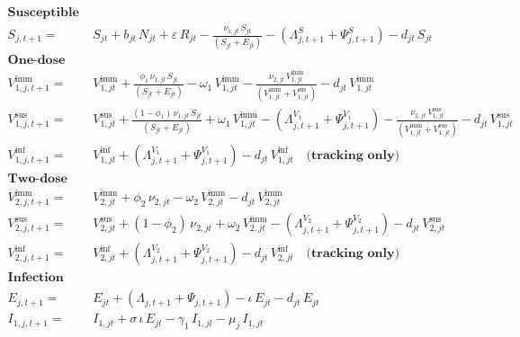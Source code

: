 \documentclass[
]{book}
\begin{document}
\begin{equation}
\begin{aligned}
\mathbf{\text{Susceptible population:}}\\[1mm]
S_{j,t+1} = \ & 
S_{jt} 
+ b_{jt}\,N_{jt} 
+ \varepsilon\,R_{jt} 
- \frac{\nu_{1,jt}\,S_{jt}}{\left(S_{jt}+E_{jt}\right)} 
- \left( \Lambda^{S}_{j,t+1} + \Psi^{S}_{j,t+1} \right) 
- d_{jt}\,S_{jt}\\[3mm]
\mathbf{\text{One-dose vaccination:}}\\[1mm]
V^{\text{imm}}_{1,j,t+1} = \ & 
V^{\text{imm}}_{1,jt} 
+ \frac{\phi_1\,\nu_{1,jt}\,S_{jt}}{\left(S_{jt}+E_{jt}\right)}
- \omega_1\,V^{\text{imm}}_{1,jt} 
- \frac{\nu_{2,jt}\,V^{\text{imm}}_{1,jt}}{\left(V^{\text{imm}}_{1,jt}+V^{\text{sus}}_{1,jt}\right)}
- d_{jt}\,V^{\text{imm}}_{1,jt}\\[1mm]
V^{\text{sus}}_{1,j,t+1} = \ & 
V^{\text{sus}}_{1,jt} 
+ \frac{\left(1-\phi_1\right)\,\nu_{1,jt}\,S_{jt}}{\left(S_{jt}+E_{jt}\right)}
+ \omega_1\,V^{\text{imm}}_{1,jt} 
- \left( \Lambda^{V_1}_{j,t+1} + \Psi^{V_1}_{j,t+1} \right) 
- \frac{\nu_{2,jt}\,V^{\text{sus}}_{1,jt}}{\left(V^{\text{imm}}_{1,jt}+V^{\text{sus}}_{1,jt}\right)} 
- d_{jt}\,V^{\text{sus}}_{1,jt}\\[1mm]
V^{\text{inf}}_{1,j,t+1} = \ & 
V^{\text{inf}}_{1,jt} 
+ \left( \Lambda^{V_1}_{j,t+1} + \Psi^{V_1}_{j,t+1} \right) 
- d_{jt}\,V^{\text{inf}}_{1,jt} \quad \mathbf{\text{(tracking only)}}\\[6mm]
\mathbf{\text{Two-dose vaccination:}}\\[3mm]
V^{\text{imm}}_{2,j,t+1} = \ & 
V^{\text{imm}}_{2,jt} 
+ \phi_2\,\nu_{2,jt} 
- \omega_2\,V^{\text{imm}}_{2,jt} 
- d_{jt}\,V^{\text{imm}}_{2,jt}\\[3mm]
V^{\text{sus}}_{2,j,t+1} = \ & 
V^{\text{sus}}_{2,jt} 
+ \left(1-\phi_2\right)\,\nu_{2,jt} 
+ \omega_2\,V^{\text{imm}}_{2,jt} 
- \left( \Lambda^{V_2}_{j,t+1} + \Psi^{V_2}_{j,t+1} \right) 
- d_{jt}\,V^{\text{sus}}_{2,jt}\\[3mm]
V^{\text{inf}}_{2,j,t+1} = \ &
V^{\text{inf}}_{2,jt} 
+ \left( \Lambda^{V_2}_{j,t+1} + \Psi^{V_2}_{j,t+1} \right) 
- d_{jt}\,V^{\text{inf}}_{2,jt} \quad \mathbf{\text{(tracking only)}}\\[6mm]
\mathbf{\text{Infection dynamics:}}\\[3mm]
E_{j,t+1} = \ &
E_{jt} 
+ \left( \Lambda_{j,t+1} + \Psi_{j,t+1}\right) 
- \iota\,E_{jt} 
- d_{jt}\,E_{jt}\\[3mm]
I_{1,j,t+1} = \ &
I_{1,jt} 
+ \sigma\,\iota\,E_{jt} 
- \gamma_1\,I_{1,jt} 
- \mu_j\,I_{1,jt} 

\end{aligned}
\end{equation}
\end{document}
